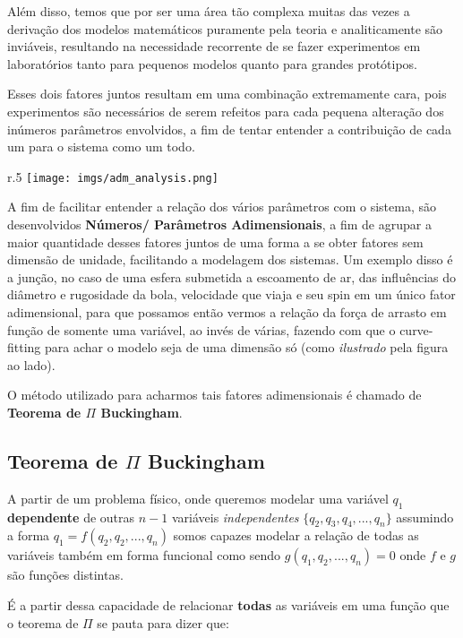 \documentclass{article}
\begin{document}
Além disso, temos que por ser uma área tão complexa muitas das vezes a derivação dos modelos matemáticos puramente pela teoria e analiticamente são inviáveis, resultando na necessidade recorrente de se fazer experimentos
em laboratórios tanto para pequenos modelos quanto para grandes protótipos.

Esses dois fatores juntos resultam em uma combinação extremamente cara, pois experimentos são necessários de serem refeitos para cada pequena alteração dos inúmeros parâmetros envolvidos, a fim de tentar entender a contribuição de cada um para o sistema como um todo.

\begin{wrapfigure}{r}{.5\textwidth}
    \centering
    \texttt{[image: imgs/adm\_analysis.png]}
\end{wrapfigure}

A fim de facilitar entender a relação dos vários parâmetros com o sistema, são desenvolvidos \textbf{Números/ Parâmetros Adimensionais}, a fim de agrupar a maior quantidade desses fatores juntos de uma forma
a se obter fatores sem dimensão de unidade, facilitando a modelagem dos sistemas. Um exemplo disso é a junção, no caso de uma esfera submetida a escoamento de ar, das influências do diâmetro e rugosidade da bola, velocidade que viaja e seu spin em um único fator adimensional, para que possamos então vermos a relação da força de arrasto em função de somente uma variável, ao invés de várias, fazendo com que
o curve-fitting para achar o modelo seja de uma dimensão só (como \emph{ilustrado} pela figura ao lado).

O método utilizado para acharmos tais fatores adimensionais é chamado de \textbf{Teorema de $\Pi$ Buckingham}.

\subsection{Teorema de $\Pi$ Buckingham}

A partir de um problema físico, onde queremos modelar uma variável $q_1$ \textbf{dependente} de outras $n-1$ variáveis \emph{independentes} $\{q_2, q_3, q_4, ..., q_{n}\}$ assumindo a forma $q_1 = f(q_2, q_2, ..., q_n)$ somos capazes modelar a relação de todas as variáveis também em forma funcional como sendo $g(q_1, q_2, ..., q_n) = 0$ onde $f$ e $g$ são funções distintas.

É a partir dessa capacidade de relacionar \textbf{todas} as variáveis em uma função que o teorema de $\Pi$ se pauta para dizer que:
\end{document}
